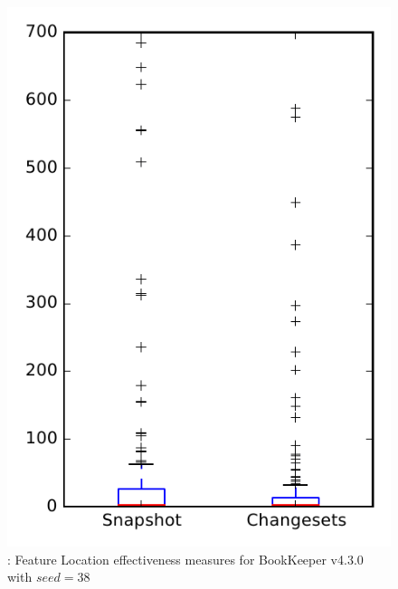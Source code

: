 
\begin{figure}
\centering
\includegraphics[height=0.4\textheight]{figures/flt_seed/rq1_bookkeeper_38}
\caption{\rone: Feature Location effectiveness measures for BookKeeper v4.3.0 with $seed=38$}
\label{fig:flt_seed:rq1:bookkeeper}
\end{figure}
